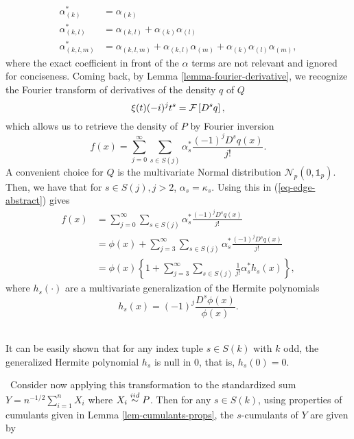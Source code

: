 \begin{align*}
    \alpha^*_{(k)} &= \alpha_{(k)} \\
    \alpha^*_{(k, l)} &= \alpha_{(k, l)} + \alpha_{(k)}\alpha_{(l)}\\
    \alpha^*_{(k, l, m)} &= \alpha_{(k, l, m)} + \alpha_{(k, l)}\alpha_{(m)} + \alpha_{(k)}\alpha_{(l)}\alpha_{(m)},
\end{align*}
where the exact coefficient in front of the $\alpha$ terms are not relevant and ignored for conciseness. Coming back, by Lemma \ref{lemma-fourier-derivative}, we recognize the Fourier transform of derivatives of the density $q$ of $Q$
\begin{equation*}
    \xi(t) (-i)^{j} t^s  = \mathcal{F} \left[ D^s q \right],
\end{equation*}
which allows us to retrieve the density of $P$ by Fourier inversion
\begin{equation}\label{eq-edge-abstract}
    f(x) = 
    \sum_{j=0}^\infty 
    \sum_{s \in S(j)}
    \alpha^*_s \frac{(-1)^j D^s q(x)}{j!}.
\end{equation}
A convenient choice for $Q$ is the multivariate Normal distribution $\mathcal{N}_p(0, \mathbb{1}_p)$. Then, we have that for $s \in S(j), j > 2$, $\alpha_s = \kappa_s$. Using this in (\ref{eq-edge-abstract}) gives
\begin{align}
    f(x) 
    &= \sum_{j=0}^\infty  \sum_{s \in S(j)} \alpha^*_s \frac{(-1)^j D^s q(x)}{j!} \nonumber \\
    &= \phi(x) + \sum_{j=3}^\infty  \sum_{s \in S(j)} \alpha^*_s \frac{(-1)^j D^s q(x)}{j!} \nonumber \\
    &= \phi(x) \left\{
        1 + \sum_{j=3}^\infty  \sum_{s \in S(j)} \frac{1}{j!}\alpha^*_s h_s(x)
    \right\}, \label{eq-edgeworth-full}
\end{align} 
where $h_s(\cdot)$ are a multivariate generalization of the Hermite polynomials
\begin{equation*}
    h_s(x) = (-1)^j \frac{D^s \phi(x)}{\phi(x)}.
\end{equation*}
\
\begin{remark} \label{rem-hermite-odd}
    It can be easily shown that for any index tuple $s \in S(k)$ with $k$ odd, the generalized Hermite polynomial $h_s$ is null in 0, that is, $h_s(0) = 0$.
\end{remark}
\
Consider now applying this transformation to the standardized sum $Y = n^{-1/2}\sum_{i=1}^n X_i$ where $X_i \stackrel{iid}{\sim} P$. Then for any $s \in S(k)$, using properties of cumulants given in Lemma \ref{lem-cumulants-props}, the $s$-cumulants of $Y$ are given by 
